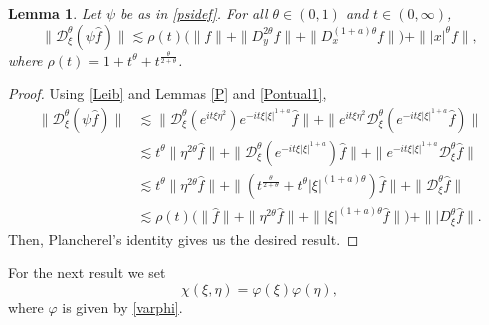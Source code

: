 \documentclass[reqno]{amsart}
\newcommand{\Dt}{\mathcal{D}^{\theta}_\xi}
\numberwithin{equation}{section}
\newtheorem{lemma}[theorem]{Lemma}
\begin{document}
\begin{lemma}\label{DF}Let $\psi$ be as in \eqref{psidef}. For all $\theta \in (0,1)$ and $t\in (0,\infty)$,
\begin{equation*}
\|\Dt(\psi \hat{f})\|\lesssim \rho(t)\Big(\|f\|+\|D_y^{2\theta}f\|+\|D_x^{(1+a)\theta}f\|\Big)+\||x|^\theta f\|,
\end{equation*}
where $\rho(t)=1+t^\theta+t^{\frac{\theta}{2+\theta}}$.
\end{lemma}
\begin{proof}
Using \eqref{Leib} and Lemmas \ref{P} and \ref{Pontual1},
\begin{equation*}
\begin{split}
\|\Dt(\psi \hat{f})\|&\lesssim \|\Dt (e^{it\xi\eta^2})e^{-it\xi|\xi|^{1+a}}\hat{f}\|+\|e^{it\xi\eta^2}\Dt(e^{-it\xi|\xi|^{1+a}}\hat{f})\|\\
&\lesssim t^\theta \|\eta^{2\theta}\hat{f}\|+\|\Dt(e^{-it\xi|\xi|^{1+a}})\hat{f}\|+\|e^{-it\xi|\xi|^{1+a}}\Dt \hat{f}\|\\
&\lesssim t^\theta \|\eta^{2\theta}\hat{f}\|+\|(t^{\frac{\theta}{2+\theta}}+t^\theta |\xi|^{(1+a)\theta})\hat{f}\|+\|\Dt \hat{f}\|\\
&\lesssim \rho(t)\Big(\|\hat{f}\|+\|\eta^{2\theta}\hat{f}\|+\||\xi|^{(1+a)\theta}\hat{f}\|\Big)+\||D_\xi^\theta \hat{f}\|.
\end{split}
\end{equation*}
Then, Plancherel's identity gives us the desired result.
\end{proof}

For the next result we set
\begin{equation}\label{chi}
\chi(\xi,\eta)=\varphi(\xi)\varphi(\eta),
\end{equation}
where $\varphi$ is given by \eqref{varphi}.
\end{document}
